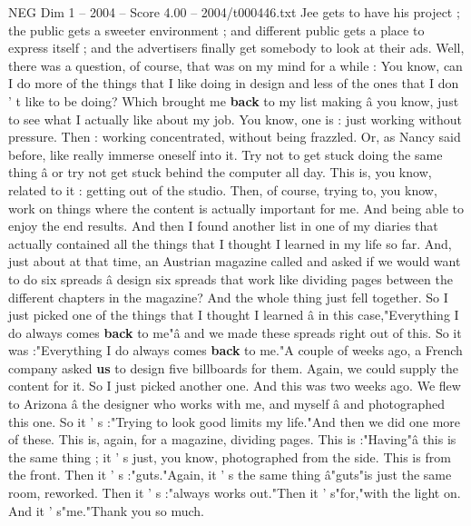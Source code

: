 \begin{textsample}{NEG Dim 1 – 2004 – Score 4.00 – 2004/t000446.txt}
Jee gets to have his project ; the public gets a sweeter environment ; and different public gets a place to express itself ; and the advertisers finally get somebody to look at their ads.
Well, there was a question, of course, that was on my mind for a while : You know, can I do more of the things that I like doing in design and less of the ones that I don ' t like to be doing?
Which brought me \textbf{back} to my list making â you know, just to see what I actually like about my job.
You know, one is : just working without pressure.
Then : working concentrated, without being frazzled.
Or, as Nancy said before, like really immerse oneself into it.
Try not to get stuck doing the same thing â or try not get stuck behind the computer all day.
This is, you know, related to it : getting out of the studio.
Then, of course, trying to, you know, work on things where the content is actually important for me.
And being able to enjoy the end results.
And then I found another list in one of my diaries that actually contained all the things that I thought I learned in my life so far.
And, just about at that time, an Austrian magazine called and asked if we would want to do six spreads â design six spreads that work like dividing pages between the different chapters in the magazine?
And the whole thing just fell together.
So I just picked one of the things that I thought I learned â in this case,"Everything I do always comes \textbf{back} to me"â and we made these spreads right out of this.
So it was :"Everything I do always comes \textbf{back} to me."A couple of weeks ago, a French company asked \textbf{us} to design five billboards for them.
Again, we could supply the content for it.
So I just picked another one.
And this was two weeks ago.
We flew to Arizona â the designer who works with me, and myself â and photographed this one.
So it ' s :"Trying to look good limits my life."And then we did one more of these.
This is, again, for a magazine, dividing pages.
This is :"Having"â this is the same thing ; it ' s just, you know, photographed from the side.
This is from the front.
Then it ' s :"guts."Again, it ' s the same thing â"guts"is just the same room, reworked.
Then it ' s :"always works out."Then it ' s"for,"with the light on.
And it ' s"me."Thank you so much.

\end{textsample}
